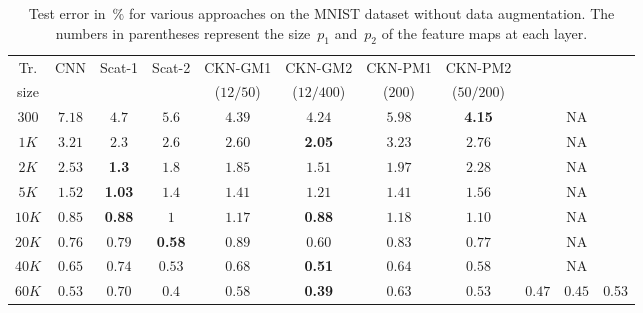 \begin{table}
   \centering
   \renewcommand\tabcolsep{0.16cm}
   \footnotesize
\begin{tabular}{ | c | c |c| c || c | c | c | c || c |c |c|}
\hline
Tr. & CNN & Scat-1 & Scat-2 & CKN-GM1 & CKN-GM2 & CKN-PM1 & CKN-PM2 & \multirow{2}{*}{\cite{zeiler2013}} & \multirow{2}{*}{\cite{goodfellow2013}} & \multirow{2}{*}{\cite{jarrett2009}}  \\
size & \cite{ranzato2007} & \cite{bruna2013} & \cite{bruna2013} & ($12/50$) & ($12/400$) & ($200$) & ($50/200$) &  & & \\
\hline
$300$   & $7.18$ & $4.7$ & $5.6$ & $4.39$ & $4.24$ & $5.98$ & {\bfseries 4.15} & \multicolumn{3}{c|}{NA}\\
$1K$    & $3.21$ & $2.3$ & $2.6$ &   $2.60$ & {\bfseries 2.05} & $3.23$ & $2.76$ & \multicolumn{3}{c|}{NA}\\
$2K$    & $2.53$ & {\bfseries 1.3} & $1.8$ & $1.85$ & $1.51$ & $1.97$ & $2.28$ &  \multicolumn{3}{c|}{NA}\\
$5K$    & $1.52$ & {\bfseries 1.03} & $1.4$ &  $1.41$ & $1.21$ & $1.41$ & $1.56$ &  \multicolumn{3}{c|}{NA}\\
$10K$   & $0.85$ & {\bfseries 0.88} & $1$ & $1.17$ & {\bfseries 0.88} & $1.18$ & $1.10$ &  \multicolumn{3}{c|}{NA}\\
$20K$   & $0.76$ & $0.79$ & {\bfseries 0.58} & $0.89$ & $0.60$ & $0.83$ & $0.77$ &  \multicolumn{3}{c|}{NA}\\
$40K$   & $0.65$ & $0.74$ & $0.53$ & $0.68$ & {\bfseries 0.51} & $0.64$ & $0.58$ &  \multicolumn{3}{c|}{NA}\\
\hline
$60K$   & $0.53$ & $0.70$ & $0.4$ & $0.58$ & {\bfseries 0.39} & $0.63$ & $0.53$ & $0.47$ & $0.45$ & 0.53 \\
\hline
\end{tabular}
\caption{Test error in~$\%$ for various approaches on the MNIST dataset without data augmentation. The numbers in parentheses represent the size~$p_1$ and~$p_2$ of the feature maps at each layer.}\label{table:mnist}
\vs
\vs
\end{table}



\vsb
